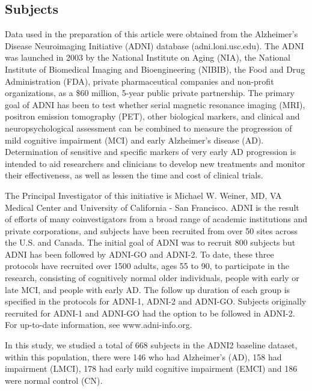 \documentclass[authoryear,preprint,revi	ew,12pt]{elsarticle}
\newcommand{\Alzheimers} {{Alzheimer\textquoteright s} }
\begin{document}
\subsection{Subjects}
\label{sec:subjects}
Data used in the preparation of this article were obtained from the Alzheimer\textquoteright s Disease Neuroimaging Initiative (ADNI) database (adni.loni.usc.edu). The ADNI was launched in 2003 by the National Institute on Aging (NIA), the National Institute of Biomedical Imaging and Bioengineering (NIBIB), the Food and Drug Administration (FDA), private pharmaceutical companies and non-profit organizations, as a \$60 million, 5-year public private partnership. The primary goal of ADNI has been to test whether serial magnetic resonance imaging (MRI), positron emission tomography (PET), other biological markers, and clinical and neuropsychological assessment can be combined to measure the progression of mild cognitive impairment (MCI) and early Alzheimer\textquoteright s disease (AD). Determination of sensitive and specific markers of very early AD progression is intended to aid researchers and clinicians to develop new treatments and monitor their effectiveness, as well as lessen the time and cost of clinical trials.

The Principal Investigator of this initiative is Michael W. Weiner, MD, VA Medical Center and University of California - San Francisco. ADNI is the result of efforts of many coinvestigators from a broad range of academic institutions and private corporations, and subjects have been recruited from over 50 sites across the U.S. and Canada. The initial goal of ADNI was to recruit 800 subjects but ADNI has been followed by ADNI-GO and ADNI-2. To date, these three protocols have recruited over 1500 adults, ages 55 to 90, to participate in the research, consisting of cognitively normal older individuals, people with early or late MCI, and people with early AD. The follow up duration of each group is specified in the protocols for ADNI-1, ADNI-2 and ADNI-GO. Subjects originally recruited for ADNI-1 and ADNI-GO had the option to be followed in ADNI-2. For up-to-date information, see www.adni-info.org.

In this study, we studied a total of 668 subjects in the ADNI2 baseline dataset, within this population, there were 146 who had \Alzheimers (AD), 158 had impairment (LMCI), 178 had early mild cognitive impairment (EMCI) and 186 were normal control (CN).  
\end{document}

